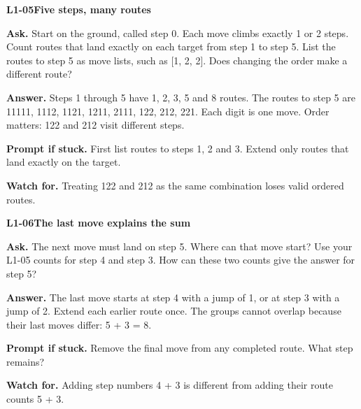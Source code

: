 \documentclass[11pt,a4paper]{article}
\begin{document}
\par\medskip
\noindent\begin{minipage}{\textwidth}
{\color{teal}\textbf{L1-05}}\quad \textbf{Five steps, many routes}\par\smallskip
\textbf{Ask.} Start on the ground, called step 0. Each move climbs exactly 1 or 2 steps. Count routes that land exactly on each target from step 1 to step 5. List the routes to step 5 as move lists, such as [1, 2, 2]. Does changing the order make a different route?\par\smallskip
\textbf{Answer.} Steps 1 through 5 have 1, 2, 3, 5 and 8 routes. The routes to step 5 are 11111, 1112, 1121, 1211, 2111, 122, 212, 221. Each digit is one move. Order matters: 122 and 212 visit different steps.\par\smallskip
\textbf{Prompt if stuck.} First list routes to steps 1, 2 and 3. Extend only routes that land exactly on the target.\par\smallskip
\textbf{Watch for.} Treating 122 and 212 as the same combination loses valid ordered routes.
\end{minipage}\par{}\medskip

\noindent\begin{minipage}{\textwidth}
{\color{teal}\textbf{L1-06}}\quad \textbf{The last move explains the sum}\par\smallskip
\textbf{Ask.} The next move must land on step 5. Where can that move start? Use your L1-05 counts for step 4 and step 3. How can these two counts give the answer for step 5?\par\smallskip
\textbf{Answer.} The last move starts at step 4 with a jump of 1, or at step 3 with a jump of 2. Extend each earlier route once. The groups cannot overlap because their last moves differ: 5 + 3 = 8.\par\smallskip
\textbf{Prompt if stuck.} Remove the final move from any completed route. What step remains?\par\smallskip
\textbf{Watch for.} Adding step numbers 4 + 3 is different from adding their route counts 5 + 3.
\end{minipage}\par{}\medskip
\end{document}
